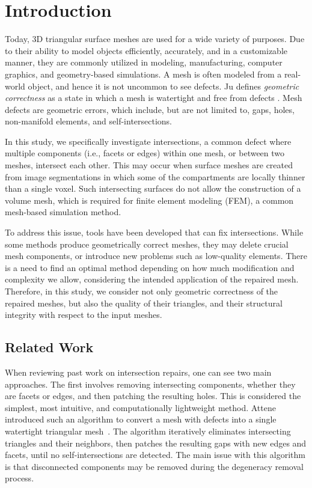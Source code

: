 \section{Introduction}
Today, 3D triangular surface meshes are used for a wide variety of purposes. Due to their ability to model objects efficiently, accurately, and in a customizable manner, they are commonly utilized in modeling, manufacturing, computer graphics, and geometry-based simulations. A mesh is often modeled from a real-world object, and hence it is not uncommon to see defects. Ju defines \textit{geometric correctness} as a state in which a mesh is watertight and free from defects \cite {ju2009geometric_errors}. Mesh defects are geometric errors, which include, but are not limited to, gaps, holes, non-manifold elements, and self-intersections. 

In this study, we specifically investigate intersections, a common defect where multiple components (i.e., facets or edges) within one mesh, or between two meshes, intersect each other. This may occur when surface meshes are created from image segmentations in which some of the compartments are locally thinner than a single voxel. Such intersecting surfaces do not allow the construction of a volume mesh, which is required for finite element modeling (FEM), a common mesh-based simulation method.

To address this issue, tools have been developed that can fix intersections. While some methods produce geometrically correct meshes, they may delete crucial mesh components, or introduce new problems such as low-quality elements. There is a need to find an optimal method depending on how much modification and complexity we allow, considering the intended application of the repaired mesh. Therefore, in this study, we consider not only geometric correctness of the repaired meshes, but also the quality of their triangles, and their structural integrity with respect to the input meshes. 

\subsection{Related Work}
When reviewing past work on intersection repairs, one can see two main approaches. The first involves removing intersecting components, whether they are facets or edges, and then patching the resulting holes. This is considered the simplest, most intuitive, and computationally lightweight method. Attene introduced such an algorithm to convert a mesh with defects into a single watertight triangular mesh~\cite{attene2010lightweight}. The algorithm iteratively eliminates intersecting triangles and their neighbors, then patches the resulting gaps with new edges and facets, until no self-intersections are detected. The main issue with this algorithm is that disconnected components may be removed during the degeneracy removal process. 

